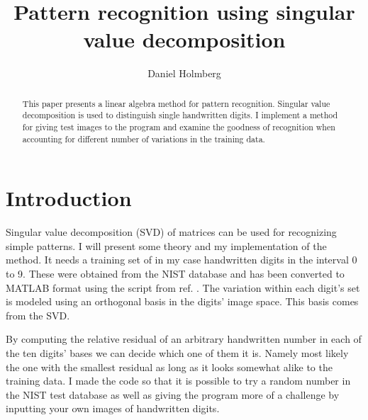 \documentclass[notitlepage]{report}
\begin{document}
\begin{titlepage}
\thispagestyle{empty}

\title{Pattern recognition using singular value decomposition}
\author{Daniel Holmberg}
\maketitle

\vfill

\begin{abstract}
This paper presents a linear algebra method for pattern recognition. Singular value decomposition is used to distinguish single handwritten digits. I implement a method for giving test images to the program and examine the goodness of recognition when accounting for different number of variations in the training data.
\end{abstract}

\vfill

\renewcommand{\chapter}[2]{}
\tableofcontents

\vfill

\end{titlepage}

\section{Introduction}
Singular value decomposition (SVD) of matrices can be used for recognizing simple patterns. I will present some theory and my implementation of the method. It needs a training set of in my case handwritten digits in the interval 0 to 9. These were obtained from the NIST database \cite{nistdata} and has been converted to MATLAB format \cite{helsinkidata} using the script from ref. \cite{converted}. The variation within each digit's set is modeled using an orthogonal basis in the digits' image space. This basis comes from the SVD.

By computing the relative residual of an arbitrary handwritten number in each of the ten digits' bases we can decide which one of them it is. Namely most likely the one with the smallest residual as long as it looks somewhat alike to the training data. I made the code so that it is possible to try a random number in the NIST test database as well as giving the program more of a challenge by inputting your own images of handwritten digits.
\end{document}
